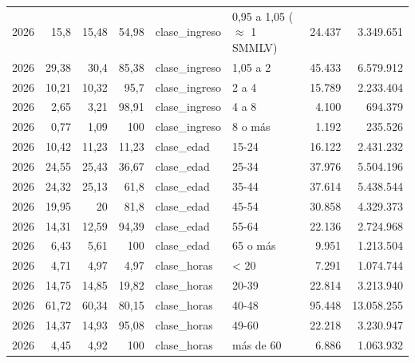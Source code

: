 \begin{tabular}{lrrrllrr}
2026 & 15,8 & 15,48 & 54,98 & clase\_ingreso & 0,95 a 1,05 ($\approx$ 1 SMMLV) & 24.437 & 3.349.651 \\
2026 & 29,38 & 30,4 & 85,38 & clase\_ingreso & 1,05 a 2 & 45.433 & 6.579.912 \\
2026 & 10,21 & 10,32 & 95,7 & clase\_ingreso & 2 a 4 & 15.789 & 2.233.404 \\
2026 & 2,65 & 3,21 & 98,91 & clase\_ingreso & 4 a 8 & 4.100 & 694.379 \\
2026 & 0,77 & 1,09 & 100 & clase\_ingreso & 8 o más & 1.192 & 235.526 \\
2026 & 10,42 & 11,23 & 11,23 & clase\_edad & 15-24 & 16.122 & 2.431.232 \\
2026 & 24,55 & 25,43 & 36,67 & clase\_edad & 25-34 & 37.976 & 5.504.196 \\
2026 & 24,32 & 25,13 & 61,8 & clase\_edad & 35-44 & 37.614 & 5.438.544 \\
2026 & 19,95 & 20 & 81,8 & clase\_edad & 45-54 & 30.858 & 4.329.373 \\
2026 & 14,31 & 12,59 & 94,39 & clase\_edad & 55-64 & 22.136 & 2.724.968 \\
2026 & 6,43 & 5,61 & 100 & clase\_edad & 65 o más & 9.951 & 1.213.504 \\
2026 & 4,71 & 4,97 & 4,97 & clase\_horas & < 20 & 7.291 & 1.074.744 \\
2026 & 14,75 & 14,85 & 19,82 & clase\_horas & 20-39 & 22.814 & 3.213.940 \\
2026 & 61,72 & 60,34 & 80,15 & clase\_horas & 40-48 & 95.448 & 13.058.255 \\
2026 & 14,37 & 14,93 & 95,08 & clase\_horas & 49-60 & 22.218 & 3.230.947 \\
2026 & 4,45 & 4,92 & 100 & clase\_horas & más de 60 & 6.886 & 1.063.932 \\
\bottomrule
\end{tabular}
